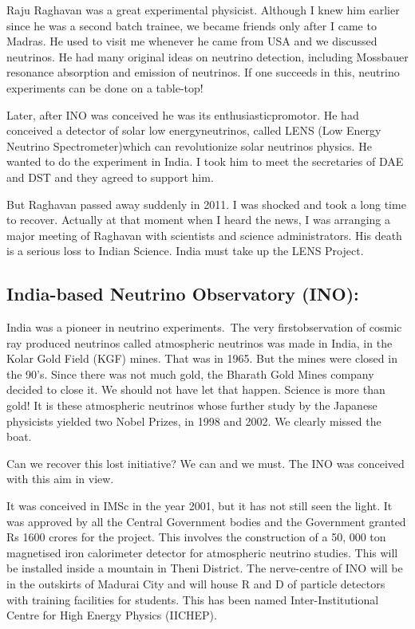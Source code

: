 Raju Raghavan was a great experimental physicist. Although I knew him 
earlier since he was a second batch trainee, we becam\-e friends only 
after I came to Madras. He used to visit me whenever he came from USA 
and we discussed neutrinos. He had many origina\-l ideas on neutrino 
detection, including Mossbauer resonance absorption and emission of 
neutrinos. If one succeeds in this, neutrino experiments can be done on 
a table-top!


Later, after INO was conceived he was its enthusiastic\break promotor. He had 
conceived a detector of solar low energy\break neutrinos, called LENS (Low 
Energy Neutrino Spectrometer)\break which can revolutionize solar neutrinos 
physics. He wanted to do the experiment in India. I took him to meet the 
secretaries of DAE and DST and they agreed to support him.


But Raghavan passed away suddenly in 2011. I was shocked and took a long 
time to recover. Actually at that moment when I heard the news, I was 
arranging a major meeting of Raghavan with scientists and science 
administrators. His death is a serious loss to Indian Science. India 
must take up the LENS Project.


\subsection*{India-based Neutrino Observatory (INO):}

India was a pioneer in neutrino experiments.\ The very first\break observation 
of cosmic ray produced neutrinos called atmospheric neutrinos was made 
in India, in the Kolar Gold Field (KGF) mines. That was in 1965. But the 
mines were closed in the 90's. Since there was not much gold, the 
Bharath Gold Mines company decided to close it. We should not have let 
that happen. Science is more than gold! It is these atmospheric 
neutrinos whose further study by the Japanese physicists yielded two 
Nobel Prizes, in 1998 and 2002. We clearly missed the boat.

Can we recover this lost initiative? We can and we must. The INO was 
conceived with this aim in view.

It was conceived in IMSc in the year 2001, but it has not still seen the 
light. It was approved by all the Central Government bodies and the 
Government granted Rs 1600 crores for the project. This involves the 
construction of a 50, 000 ton magnetised iron calorimeter detector for 
atmospheric neutrino studies. This will be installed inside a mountain 
in Theni District. The nerve-centre of INO will be in the outskirts of 
Madurai City and will house R and D of particle detectors with training 
facilities for students. This has been named Inter-Institutional Centre 
for High Energy Physics (IICHEP).

